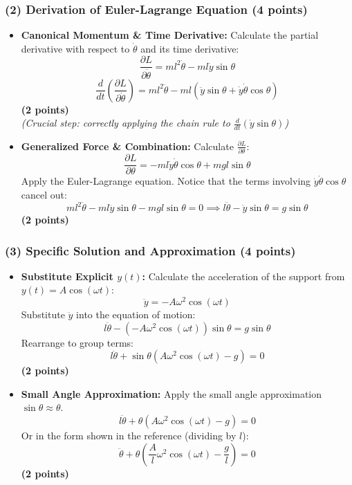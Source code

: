 \documentclass[11pt, a4paper]{article} %
\begin{document}
\subsubsection*{(2) Derivation of Euler-Lagrange Equation (4 points)}
\begin{itemize}
    \item \textbf{Canonical Momentum \& Time Derivative:}
    Calculate the partial derivative with respect to $\dot{\theta}$ and its time derivative:
    \[
    \frac{\partial L}{\partial \dot{\theta}} = m l^2 \dot{\theta} - m l \dot{y} \sin \theta
    \]
    \[
    \frac{d}{dt}\left( \frac{\partial L}{\partial \dot{\theta}} \right) = m l^2 \ddot{\theta} - m l (\ddot{y} \sin \theta + \dot{y} \dot{\theta} \cos \theta)
    \]
    \hfill \textbf{(2 points)} \\
    \textit{(Crucial step: correctly applying the chain rule to $\frac{d}{dt}(\dot{y} \sin \theta)$)}

    \item \textbf{Generalized Force \& Combination:}
    Calculate $\frac{\partial L}{\partial \theta}$:
    \[
    \frac{\partial L}{\partial \theta} = - m l \dot{y} \dot{\theta} \cos \theta + mgl \sin \theta
    \]
    Apply the Euler-Lagrange equation. Notice that the terms involving $\dot{y}\dot{\theta}\cos\theta$ cancel out:
    \[
    m l^2 \ddot{\theta} - m l \ddot{y} \sin \theta - mgl \sin \theta = 0 \implies l \ddot{\theta} - \ddot{y} \sin \theta = g \sin \theta
    \]
    \hfill \textbf{(2 points)}
\end{itemize}

\subsubsection*{(3) Specific Solution and Approximation (4 points)}
\begin{itemize}
    \item \textbf{Substitute Explicit $y(t)$:}
    Calculate the acceleration of the support from $y(t) = A \cos(\omega t)$:
    \[
    \ddot{y} = -A \omega^2 \cos(\omega t)
    \]
    Substitute $\ddot{y}$ into the equation of motion:
    \[
    l \ddot{\theta} - (-A \omega^2 \cos(\omega t)) \sin \theta = g \sin \theta
    \]
    Rearrange to group terms:
    \[
    l \ddot{\theta} + \sin \theta (A \omega^2 \cos(\omega t) - g) = 0
    \]
    \hfill \textbf{(2 points)}

    \item \textbf{Small Angle Approximation:}
    Apply the small angle approximation $\sin \theta \approx \theta$.
    \[
    l \ddot{\theta} + \theta (A \omega^2 \cos(\omega t) - g) = 0
    \]
    Or in the form shown in the reference (dividing by $l$):
    \[
    \ddot{\theta} + \theta \left( \frac{A}{l} \omega^2 \cos(\omega t) - \frac{g}{l} \right) = 0
    \]
    \hfill \textbf{(2 points)}
\end{itemize}
\end{document}
